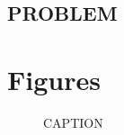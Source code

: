 \documentclass{article}
\begin{document}
\subsection{PROBLEM}

\pagebreak
\section{Figures}

\begin{figure}[htb!]
\begin{center}
\caption{CAPTION}
\end{center}
\end{figure}
\end{document}
